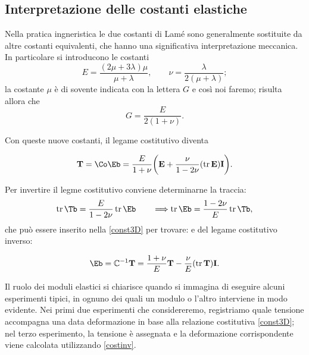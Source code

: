\subsection{Interpretazione delle costanti elastiche}
Nella pratica ingneristica le due costanti di Lamé sono generalmente sostituite da altre costanti equivalenti, che hanno una significativa interpretazione meccanica. 
In particolare si introducono le costanti
\begin{equation}
E=\frac{(2\mu+3\lambda)\mu}{\mu+\lambda}, \qquad \nu = \frac{\lambda}{2(\mu+\lambda)};
\end{equation}
la costante $\mu$ è di sovente indicata con la lettera $G$ e così noi faremo; risulta allora che
\begin{equation}
G=\frac{E}{2(1+\nu)}.
\end{equation}

Con queste nuove costanti, il legame costitutivo diventa
\begin{definition}
\begin{equation}\label{const3D}
	\mathbf{T}=\Co \Eb=\frac{E}{1+\nu}{\left(\mathbf{E}+\frac{\nu}{1-2\nu}(\operatorname{tr}\mathbf{E})\mathbf{I}\right)}.
\end{equation}
\end{definition}

Per invertire il legme costitutivo conviene determinarne la traccia:
\begin{equation}
\operatorname{tr}\Tb=\frac{E}{1-2\nu} \operatorname{tr}\Eb \qquad \Longrightarrow \operatorname{tr}\Eb =\frac{1-2\nu}{E}\operatorname{tr}\Tb,
\end{equation} 
che può essere inserito nella \eqref{const3D} per trovare:
e del legame costitutivo inverso:
\begin{definition}
\begin{equation}\label{costinv}
	\Eb=\mathbb{C}^{-1}\mathbf{T}=\frac{1+\nu}{E}\mathbf{T}-\frac{\nu}{E}(\operatorname{tr}\mathbf{T})\mathbf{I}.
\end{equation}
\end{definition}
Il ruolo dei moduli elastici si chiarisce quando si immagina di eseguire alcuni esperimenti tipici, in ognuno dei quali un modulo o l'altro interviene in modo evidente. Nei primi due esperimenti che considereremo, registriamo quale tensione accompagna una data deformazione in base alla relazione costitutiva \eqref{const3D}; nel terzo esperimento, la tensione è assegnata e la deformazione corrispondente viene calcolata utilizzando \eqref{costinv}.


